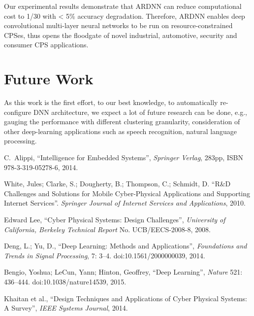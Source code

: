 Our experimental results demonstrate that ARDNN can reduce computational cost to 1/30 with < 5\% accuracy degradation.
Therefore, ARDNN enables deep convolutional multi-layer neural networks to be run on resource-constrained CPSes,
thus opens the floodgate of novel industrial, automotive, security and consumer CPS applications.


\section{Future Work}

As this work is the first effort, to our best knowledge, to automatically re-configure DNN architecture,
we expect a lot of future research can be done, e.g., gauging the performance with different clustering granularity,
consideration of other deep-learning applications such as speech recognition, natural language processing.



\begin{thebibliography}{10}

C.~Alippi, ``Intelligence for Embedded Systems'',
{\em Springer Verlag},  283pp, ISBN 978-3-319-05278-6, 2014.

White, Jules; Clarke, S.; Dougherty, B.; Thompson, C.; Schmidt, D.
``R\&D Challenges and Solutions for Mobile Cyber-Physical Applications and Supporting Internet Services''.
{\em Springer Journal of Internet Services and Applications}, 2010.

Edward Lee, ``Cyber Physical Systems: Design Challenges'',
{\em University of California, Berkeley Technical Report} No. UCB/EECS-2008-8, 2008.

Deng, L.; Yu, D., ``Deep Learning: Methods and Applications'',
{\em Foundations and Trends in Signal Processing}, 7: 3--4. doi:10.1561/2000000039, 2014.

Bengio, Yoshua; LeCun, Yann; Hinton, Geoffrey,
``Deep Learning'', {\em Nature} 521: 436--444. doi:10.1038/nature14539, 2015.

Khaitan et al.,
``Design Techniques and Applications of Cyber Physical Systems: A Survey'',
{\em IEEE Systems Journal}, 2014.

\end{thebibliography}

